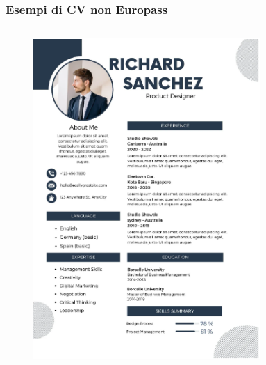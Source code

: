 \documentclass[handout]{beamer}
\begin{document}
\begin{frame}
\frametitle{Esempi di CV non Europass}
\begin{columns}
  \begin{column}{.45\textwidth}
    \begin{figure}
      \includegraphics[width=\columnwidth]{img/cv1.png}
    \end{figure} 
  \end{column}
  \begin{column}{.45\textwidth}
    \begin{figure}

\end{figure}
\end{column}
\end{columns}
\end{frame}
\end{document}
